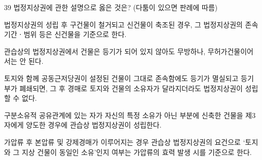 \begin{question}{39}
법정지상권에 관한 설명으로 옳은 것은? (다툼이 있으면 판례에 따름)
\begin{choices}
  \item 법정지상권의 성립 후 구건물이 철거되고 신건물이 축조된 경우, 그 법정지상권의 존속기간ㆍ범위 등은 신건물을 기준으로 한다.
  \item 관습상의 법정지상권에서 건물은 등기가 되어 있지 않아도 무방하나, 무허가건물이어서는 안 된다.
  \item 토지와 함께 공동근저당권이 설정된 건물이 그대로 존속함에도 등기가 멸실되고 등기부가 폐쇄되면, 그 후 경매로 토지와 건물의 소유자가 달라지더라도 법정지상권이 성립할 수 없다.
  \item 구분소유적 공유관계에 있는 자가 자신의 특정 소유가 아닌 부분에 신축한 건물을 제3자에게 양도한 경우에 관습상 법정지상권이 성립한다.
  \item 가압류 후 본압류 및 강제경매가 이루어지는 경우 관습상 법정지상권의 요건으로 ‘토지와 그 지상 건물이 동일인 소유’인지 여부는 가압류의 효력 발생 시를 기준으로 한다.
\end{choices}
\end{question}
